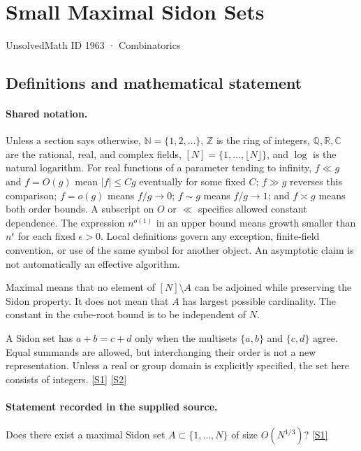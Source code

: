 \documentclass[11pt,a4paper]{article}
\newcommand{\N}{\mathbb{N}}
\newcommand{\Z}{\mathbb{Z}}
\newcommand{\Q}{\mathbb{Q}}
\newcommand{\R}{\mathbb{R}}
\newcommand{\C}{\mathbb{C}}
\newcommand{\sref}[2]{\hyperlink{source:#1:#2}{[S#2]}}
\begin{document}

\setcounter{section}{1962}

\section{Small Maximal Sidon Sets}\label{1963}

{\small\sffamily UnsolvedMath ID 1963 · Combinatorics}

\subsection{Definitions and mathematical statement}

\paragraph{Shared notation.}Unless a section says otherwise, $\N=\{1,2,\ldots\}$,
$\Z$ is the ring of integers, $\Q,\R,\C$ are the rational, real, and complex
fields, $[N]=\{1,\ldots,\lfloor N\rfloor\}$, and $\log$ is the natural
logarithm. For real functions of a parameter tending to infinity,
$f\ll g$ and $f=O(g)$ mean $|f|\leq Cg$ eventually for some fixed $C$;
$f\gg g$ reverses this comparison; $f=o(g)$ means $f/g\to0$;
$f\sim g$ means $f/g\to1$; and $f\asymp g$ means both order bounds.
A subscript on $O$ or $\ll$ specifies allowed constant dependence.
The expression $n^{o(1)}$ in an upper bound means growth smaller than
$n^\epsilon$ for each fixed $\epsilon>0$. Local definitions govern any
exception, finite-field convention, or use of the same symbol for another
object. An asymptotic claim is not automatically an effective algorithm.



Maximal means that no element of $[N]\setminus A$ can be adjoined while preserving the Sidon property. It does not mean that $A$ has largest possible cardinality. The constant in the cube-root bound is to be independent of $N$.

A Sidon set has $a+b=c+d$ only when the multisets $\{a,b\}$ and $\{c,d\}$ agree. Equal summands are allowed, but interchanging their order is not a new representation. Unless a real or group domain is explicitly specified, the set here consists of integers. \sref{1963}{1} \sref{1963}{2}

\paragraph{Statement recorded in the supplied source.}
Does there exist a maximal Sidon set $A\subset \{1,\ldots,N\}$ of size $O(N^{1/3})$? \sref{1963}{1}
\end{document}
